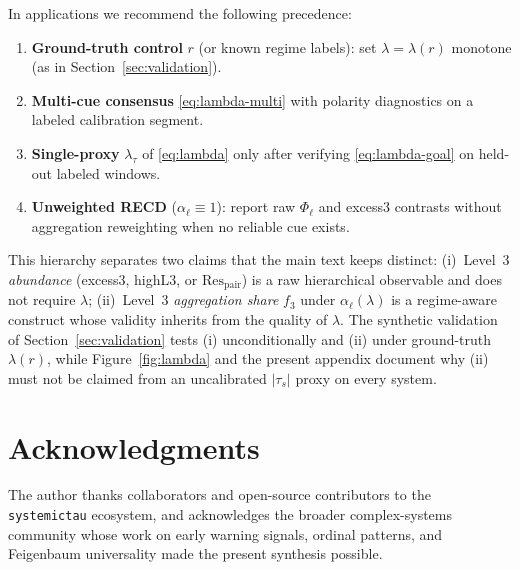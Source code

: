 \documentclass[11pt,a4paper]{article}
\begin{document}
In applications we recommend the following precedence:
\begin{enumerate}[leftmargin=*,itemsep=2pt]
  \item \textbf{Ground-truth control} $r$ (or known regime labels): set
  $\lambda=\lambda(r)$ monotone (as in Section~\ref{sec:validation}).
  \item \textbf{Multi-cue consensus} \eqref{eq:lambda-multi} with
  polarity diagnostics on a labeled calibration segment.
  \item \textbf{Single-proxy} $\lambda_\tau$ of \eqref{eq:lambda} only
  after verifying \eqref{eq:lambda-goal} on held-out labeled windows.
  \item \textbf{Unweighted RECD} ($\alpha_\ell\equiv 1$): report raw
  $\Phi_\ell$ and excess3 contrasts without aggregation reweighting when
  no reliable cue exists.
\end{enumerate}
This hierarchy separates two claims that the main text keeps distinct:
(i)~Level~3 \emph{abundance} (excess3, highL3, or
$\mathrm{Res}_{\mathrm{pair}}$) is a raw hierarchical observable and does
not require $\lambda$; (ii)~Level~3 \emph{aggregation share} $f_3$ under
$\alpha_\ell(\lambda)$ is a regime-aware construct whose validity
inherits from the quality of $\lambda$. The synthetic validation of
Section~\ref{sec:validation} tests (i) unconditionally and (ii) under
ground-truth $\lambda(r)$, while Figure~\ref{fig:lambda} and the
present appendix document why (ii) must not be claimed from an
uncalibrated $|\tau_s|$ proxy on every system.

\section*{Acknowledgments}
The author thanks collaborators and open-source contributors to the
\texttt{systemictau} ecosystem, and acknowledges the broader complex-systems
community whose work on early warning signals, ordinal patterns, and
Feigenbaum universality made the present synthesis possible.



\end{document}
